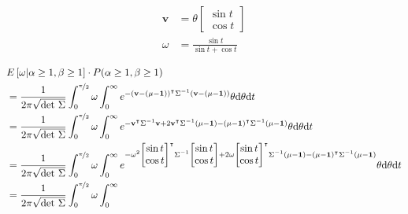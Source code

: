 \documentclass{article}
\begin{document}
\begin{equation*}
  \begin{aligned}
    \mathbf{v} &= \theta \left[ \begin{matrix} \sin t \\ \cos t \end{matrix} \right] \\
    \omega &= \frac{\sin t}{\sin t+\cos t} \\
  \end{aligned}
\end{equation*}
\begin{equation*}
  \begin{aligned}
    & E\left[ \omega | \alpha\ge 1, \beta\ge 1 \right] \cdot P(\alpha\ge 1, \beta\ge 1) \\
    &=
    \frac{1}{2\pi \sqrt{\text{det }\Sigma}}
    \int_0^{\nicefrac{\pi}{2}}
    \omega
    \int_0^\infty
    e^{-(\mathbf{v}-(\mathbf{\mu}-\mathbf{1}))^\intercal \Sigma^{-1} (\mathbf{v}-(\mathbf{\mu}-\mathbf{1}))}
    \theta
    \text{d}\theta
    \text{d}t
    \\
    &=
    \frac{1}{2\pi \sqrt{\text{det }\Sigma}}
    \int_0^{\nicefrac{\pi}{2}}
    \omega
    \int_0^\infty
    e^{
      -\mathbf{v}^\intercal \Sigma^{-1} \mathbf{v}
      + 2 \mathbf{v}^\intercal \Sigma^{-1} (\mathbf{\mu}-\mathbf{1})
      - (\mathbf{\mu}-\mathbf{1})^\intercal \Sigma^{-1} (\mathbf{\mu}-\mathbf{1})
    }
    \theta
    \text{d}\theta
    \text{d}t
    \\
    &=
    \frac{1}{2\pi \sqrt{\text{det }\Sigma}}
    \int_0^{\nicefrac{\pi}{2}}
    \omega
    \int_0^\infty
    e^{
      -\omega^2 \left[\begin{matrix} \sin t \\ \cos t \end{matrix}\right]^\intercal
      \Sigma^{-1}
      \left[\begin{matrix} \sin t \\ \cos t \end{matrix}\right]
      + 2 \omega \left[\begin{matrix} \sin t \\ \cos t \end{matrix}\right]^\intercal
      \Sigma^{-1} (\mathbf{\mu}-\mathbf{1})
      - (\mathbf{\mu}-\mathbf{1})^\intercal \Sigma^{-1} (\mathbf{\mu}-\mathbf{1})
    }
    \theta
    \text{d}\theta
    \text{d}t
    \\
    &=
    \frac{1}{2\pi \sqrt{\text{det }\Sigma}}
    \int_0^{\nicefrac{\pi}{2}}
    \omega
    \int_0^\infty

\end{aligned}
\end{equation*}
\end{document}
